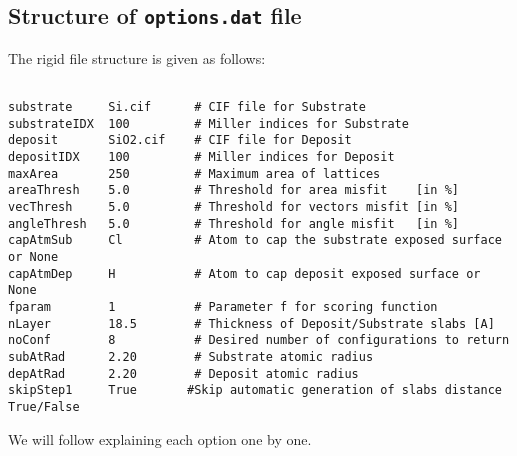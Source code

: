 \documentclass[a4paper,12pt,oneside]{article}
\begin{document}
\subsection{Structure of \texttt{options.dat} file}
The rigid file structure is given as follows:
\begin{verbatim}

substrate     Si.cif      # CIF file for Substrate
substrateIDX  100         # Miller indices for Substrate
deposit       SiO2.cif    # CIF file for Deposit
depositIDX    100         # Miller indices for Deposit
maxArea       250         # Maximum area of lattices
areaThresh    5.0         # Threshold for area misfit    [in %]
vecThresh     5.0         # Threshold for vectors misfit [in %]
angleThresh   5.0         # Threshold for angle misfit   [in %]
capAtmSub     Cl          # Atom to cap the substrate exposed surface or None
capAtmDep     H           # Atom to cap deposit exposed surface or None
fparam        1           # Parameter f for scoring function
nLayer        18.5        # Thickness of Deposit/Substrate slabs [A]
noConf        8           # Desired number of configurations to return
subAtRad      2.20        # Substrate atomic radius
depAtRad      2.20        # Deposit atomic radius
skipStep1     True       #Skip automatic generation of slabs distance True/False
\end{verbatim}
\noindent
We will follow explaining each option one by one.
\end{document}
